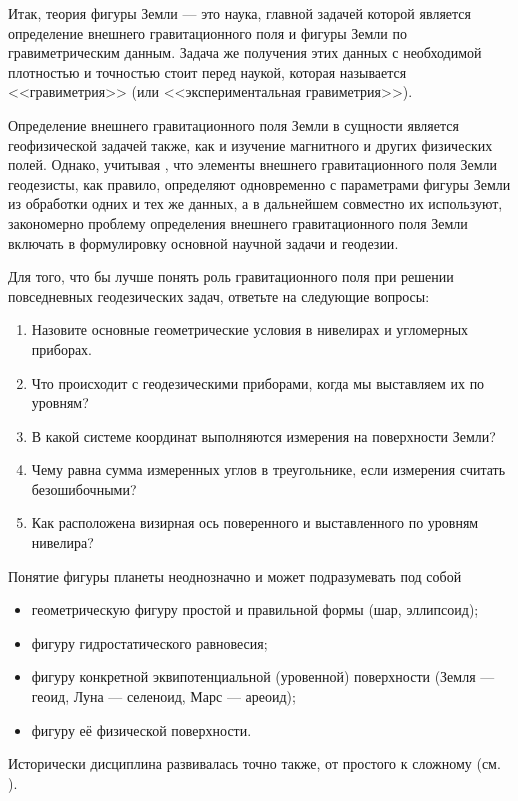 \documentclass[11pt, a4paper]{article}
\theoremstyle{plain}
\theoremstyle{definition}
\theoremstyle{remark}
\begin{document}
Итак, теория фигуры Земли --- это наука, главной задачей которой является определение внешнего
гравитационного поля и фигуры Земли по гравиметрическим данным. Задача же получения этих данных с
необходимой плотностью и точностью стоит перед наукой, 
которая называется <<гравиметрия>> (или <<экспериментальная гравиметрия>>).

Определение внешнего гравитационного поля Земли в сущности является 
геофизической задачей также, как и изучение
магнитного и других физических полей. Однако, учитывая , что
элементы внешнего гравитационного поля Земли геодезисты,
как правило, определяют одновременно с параметрами фигуры
Земли из обработки одних и тех же данных, а в дальнейшем
совместно их используют, закономерно проблему определения
внешнего гравитационного поля Земли включать в формулировку 
основной научной задачи и геодезии\cite{Pellinen1978}.

Для того, что бы лучше понять роль гравитационного поля при решении повседневных геодезических
задач, ответьте на следующие вопросы:
\begin{enumerate}
    \item Назовите основные геометрические условия в нивелирах и угломерных приборах.
    \item Что происходит с геодезическими приборами, когда мы выставляем их по уровням? 
    \item В какой системе координат выполняются измерения на поверхности Земли?
    \item Чему равна сумма измеренных углов в треугольнике, если измерения считать безошибочными?
    \item Как расположена визирная ось поверенного и выставленного по уровням нивелира?
\end{enumerate}

Понятие фигуры планеты неоднозначно и может подразумевать под собой
\begin{itemize}
    \item геометрическую фигуру простой и правильной формы (шар, эллипсоид);
    \item фигуру гидростатического равновесия;
    \item фигуру конкретной эквипотенциальной (уровенной) поверхности (Земля --- геоид, Луна ---
        селеноид, Марс --- ареоид);
    \item фигуру её физической поверхности.
\end{itemize}
Исторически дисциплина развивалась точно также, от простого к сложному (см.
\cite{Ogorodova2013,Yuzefovich2014}). 
\end{document}
